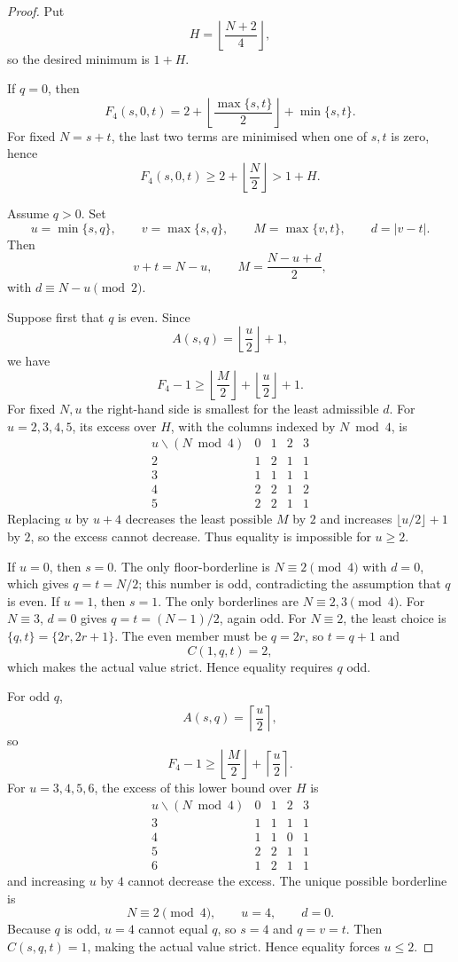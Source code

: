 \documentclass[11pt]{article}
\theoremstyle{definition}
\begin{document}
\begin{proof}
Put
\[
 H=\left\lfloor\frac{N+2}{4}\right\rfloor,
\]
so the desired minimum is $1+H$.

If $q=0$, then
\[
 F_4(s,0,t)=2+\left\lfloor\frac{\max\{s,t\}}2\right\rfloor+\min\{s,t\}.
\]
For fixed $N=s+t$, the last two terms are minimised when one of $s,t$ is zero, hence
\[
 F_4(s,0,t)\ge2+\left\lfloor\frac N2\right\rfloor>1+H.
\]

Assume $q>0$. Set
\[
 u=\min\{s,q\},\qquad v=\max\{s,q\},\qquad
 M=\max\{v,t\},\qquad d=|v-t|.
\]
Then
\[
 v+t=N-u,\qquad M=\frac{N-u+d}{2},
\]
with $d\equiv N-u\pmod2$.

Suppose first that $q$ is even. Since
\[
 A(s,q)=\left\lfloor\frac u2\right\rfloor+1,
\]
we have
\[
 F_4-1\ge
 \left\lfloor\frac M2\right\rfloor+\left\lfloor\frac u2\right\rfloor+1.
\]
For fixed $N,u$ the right-hand side is smallest for the least admissible $d$. For $u=2,3,4,5$, its excess over $H$, with the columns indexed by $N\bmod4$, is
\[
\begin{array}{c|cccc}
 u\backslash(N\bmod4)&0&1&2&3\\ \hline
2&1&2&1&1\\
3&1&1&1&1\\
4&2&2&1&2\\
5&2&2&1&1
\end{array}
\]
Replacing $u$ by $u+4$ decreases the least possible $M$ by $2$ and increases $\lfloor u/2\rfloor+1$ by $2$, so the excess cannot decrease. Thus equality is impossible for $u\ge2$.

If $u=0$, then $s=0$. The only floor-borderline is $N\equiv2\pmod4$ with $d=0$, which gives $q=t=N/2$; this number is odd, contradicting the assumption that $q$ is even. If $u=1$, then $s=1$. The only borderlines are $N\equiv2,3\pmod4$. For $N\equiv3$, $d=0$ gives $q=t=(N-1)/2$, again odd. For $N\equiv2$, the least choice is $\{q,t\}=\{2r,2r+1\}$. The even member must be $q=2r$, so $t=q+1$ and
\[
 C(1,q,t)=2,
\]
which makes the actual value strict. Hence equality requires $q$ odd.

For odd $q$,
\[
 A(s,q)=\left\lceil\frac u2\right\rceil,
\]
so
\[
 F_4-1\ge
 \left\lfloor\frac M2\right\rfloor+\left\lceil\frac u2\right\rceil.
\]
For $u=3,4,5,6$, the excess of this lower bound over $H$ is
\[
\begin{array}{c|cccc}
 u\backslash(N\bmod4)&0&1&2&3\\ \hline
3&1&1&1&1\\
4&1&1&0&1\\
5&2&2&1&1\\
6&1&2&1&1
\end{array}
\]
and increasing $u$ by $4$ cannot decrease the excess. The unique possible borderline is
\[
 N\equiv2\pmod4,\qquad u=4,\qquad d=0.
\]
Because $q$ is odd, $u=4$ cannot equal $q$, so $s=4$ and $q=v=t$. Then $C(s,q,t)=1$, making the actual value strict. Hence equality forces $u\le2$.


\end{proof}
\end{document}
